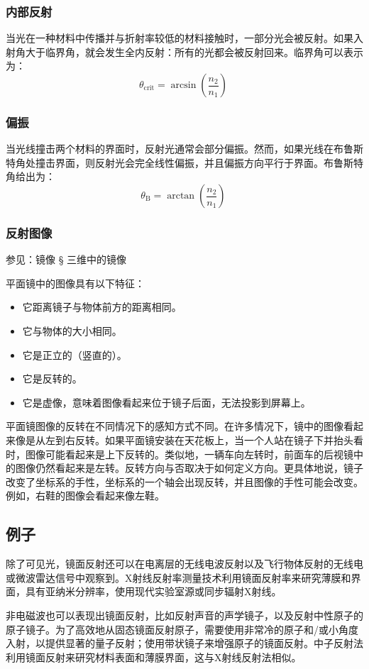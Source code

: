 \subsubsection{内部反射}

当光在一种材料中传播并与折射率较低的材料接触时，一部分光会被反射。如果入射角大于临界角，就会发生全内反射：所有的光都会被反射回来。临界角可以表示为：
\[
\theta_{\text{crit}} = \arcsin \left(\frac{n_2}{n_1}\right)~
\]
\subsubsection{偏振}
当光线撞击两个材料的界面时，反射光通常会部分偏振。然而，如果光线在布鲁斯特角处撞击界面，则反射光会完全线性偏振，并且偏振方向平行于界面。布鲁斯特角给出为：
\[
\theta_{\mathrm{B}} = \arctan \left(\frac{n_2}{n_1}\right)~
\]
\subsubsection{反射图像}

参见：镜像 § 三维中的镜像

平面镜中的图像具有以下特征：
\begin{itemize}
\item 它距离镜子与物体前方的距离相同。
\item 它与物体的大小相同。
\item 它是正立的（竖直的）。
\item 它是反转的。
\item 它是虚像，意味着图像看起来位于镜子后面，无法投影到屏幕上。
\end{itemize}
平面镜图像的反转在不同情况下的感知方式不同。在许多情况下，镜中的图像看起来像是从左到右反转。如果平面镜安装在天花板上，当一个人站在镜子下并抬头看时，图像可能看起来是上下反转的。类似地，一辆车向左转时，前面车的后视镜中的图像仍然看起来是左转。反转方向与否取决于如何定义方向。更具体地说，镜子改变了坐标系的手性，坐标系的一个轴会出现反转，并且图像的手性可能会改变。例如，右鞋的图像会看起来像左鞋。
\subsection{例子}
除了可见光，镜面反射还可以在电离层的无线电波反射以及飞行物体反射的无线电或微波雷达信号中观察到。X射线反射率测量技术利用镜面反射率来研究薄膜和界面，具有亚纳米分辨率，使用现代实验室源或同步辐射X射线。

非电磁波也可以表现出镜面反射，比如反射声音的声学镜子，以及反射中性原子的原子镜子。为了高效地从固态镜面反射原子，需要使用非常冷的原子和/或小角度入射，以提供显著的量子反射；使用带状镜子来增强原子的镜面反射。中子反射法利用镜面反射来研究材料表面和薄膜界面，这与X射线反射法相似。